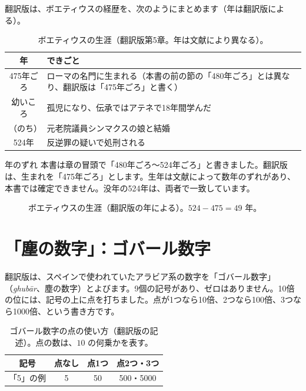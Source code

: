 \documentclass[a4paper,11pt,openany]{ltjsbook}
\begin{document}
翻訳版は、ボエティウスの経歴を、次のようにまとめます（年は翻訳版による）。

\begin{table}[htbp]
\centering
\begin{tabular}{cp{10cm}}
\toprule
年 & できごと\\
\midrule
475年ごろ & ローマの名門に生まれる（本書の前の節の「480年ごろ」とは異なり、翻訳版は「475年ごろ」と書く）\\
幼いころ & 孤児になり、伝承ではアテネで18年間学んだ\\
（のち） & 元老院議員シンマクスの娘と結婚\\
524年 & 反逆罪の疑いで処刑される\\
\bottomrule
\end{tabular}
\caption{ボエティウスの生涯（翻訳版第5章。年は文献により異なる）。}
\end{table}

\begin{notebox}{年のずれ}
本書は章の冒頭で「480年ごろ〜524年ごろ」と書きました。翻訳版は、生まれを「475年ごろ」とします。生年は文献によって数年のずれがあり、本書では確定できません。没年の524年は、両者で一致しています。
\end{notebox}

\begin{figure}[htbp]
\centering
{}
\caption{ボエティウスの生涯（翻訳版の年による）。$524-475=49$ 年。}
\end{figure}

\section{「塵の数字」：ゴバール数字}

翻訳版は、スペインで使われていたアラビア系の数字を「ゴバール数字」（\textit{ghubār}、塵の数字）とよびます。9個の記号があり、ゼロはありません。10倍の位には、記号の上に点を打ちました。点が1つなら10倍、2つなら100倍、3つなら1000倍、という書き方です。

\begin{table}[htbp]
\centering
\begin{tabular}{c|ccc}
\toprule
記号 & 点なし & 点1つ & 点2つ・3つ\\
\midrule
「5」の例 & 5 & 50 & 500・5000\\
\bottomrule
\end{tabular}
\caption{ゴバール数字の点の使い方（翻訳版の記述）。点の数は、$10$ の何乗かを表す。}
\end{table}
\end{document}
